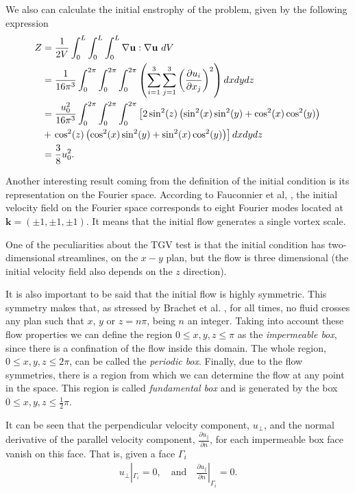 We also can calculate the initial enstrophy of the problem, given by the following expression
\begin{align}
\label{eq-TGV_wnstrophy}
Z&=\frac{1}{2V}\int_0^L\int_0^L\int_0^L\nabla\u:\nabla\u\ dV\\\nonumber
&=\frac{1}{16\pi^3}\int_0^{2\pi}\int_0^{2\pi}\int_0^{2\pi}\left(\sum_{i=1}^3\sum_{j=1}^3\left(\frac{\partial u_i}{\partial x_j}\right)^2\right)dxdydz\\\nonumber
&=\frac{u_0^2}{16\pi^3}\int_0^{2\pi}\int_0^{2\pi}\int_0^{2\pi}\left[2\sin^2(z)\left(\sin^2(x)\sin^2(y)+\cos^2(x)\cos^2(y)\right)\right.\\\nonumber
&+\left.\cos^2(z)\left(\cos^2(x)\sin^2(y)+\sin^2(x)\cos^2(y)\right)\right]dxdydz\\\nonumber
&=\frac{3}{8}u_0^2.
\end{align}

Another interesting result coming from the definition of the initial condition  is its representation on the Fourier space. According to Fauconnier et al, \cite{fauconnier_construction_2009}, the initial velocity field on the Fourier space corresponds to eight Fourier modes located at $\mathbf{k}=(\pm1,\pm1,\pm1)$. It means that the initial flow generates a single  vortex scale.

One of the peculiarities about the TGV test is that the initial condition has two-dimensional streamlines, on the $x-y$ plan, but the flow is three dimensional (the initial velocity field also depends on the $z$ direction). 

It is also important to be said that the initial flow is highly symmetric. This symmetry makes that, as stressed by Brachet et al. \cite{brachet_small-scale_1983}, for all times, no fluid crosses any plan such that $x$, $y$ or $z=n\pi$, being $n$ an integer. Taking into account these flow properties we can define the region $0\leq x,y,z\leq\pi$ as the \textit{impermeable box}, since there is a confination of the flow inside this domain. The whole region, $0\leq x,y,z\leq2\pi$, can be called the \textit{periodic box}. Finally, due to the flow symmetries, there is a region from which we can determine the flow at any point in the space. This region is called \textit{fundamental box} and is generated by the box $0\leq x,y,z\leq\frac{1}{2}\pi$.

It can be seen that the perpendicular velocity component, $u_\perp$, and the normal derivative of the parallel velocity component, $\frac{\partial u_\parallel}{\partial n}$, for each impermeable box face vanish on this face. That is, given a face $\Gamma_i$
\begin{align}
\label{eq-TGV_u_perp}
u_\perp|_{\Gamma_i}=0,\quad\mbox{and}\quad\frac{\partial u_\parallel}{\partial n}|_{\Gamma_i}=0.
\end{align}

